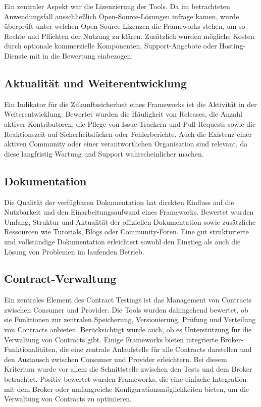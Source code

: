 Ein zentraler Aspekt war die Lizenzierung der Tools.
Da im betrachteten Anwendungsfall ausschließlich Open-Source-Lösungen infrage kamen, wurde überprüft unter welchen Open-Source-Lizenzen die Frameworks stehen, um so Rechte und Pflichten der Nutzung zu klären.
Zusätzlich wurden mögliche Kosten durch optionale kommerzielle Komponenten, Support-Angebote oder Hosting-Dienste mit in die Bewertung einbezogen.

\subsection{Aktualität und Weiterentwicklung}\label{subsec:frameworks_criterion_activity}

Ein Indikator für die Zukunftssicherheit eines Frameworks ist die Aktivität in der Weiterentwicklung.
Bewertet wurden die Häufigkeit von Releases, die Anzahl aktiver Kontributoren, die Pflege von Issue-Trackern und Pull Requests sowie die Reaktionszeit auf Sicherheitslücken oder Fehlerberichte.
Auch die Existenz einer aktiven Community oder einer verantwortlichen Organisation sind relevant, da diese langfristig Wartung und Support wahrscheinlicher machen.

\subsection{Dokumentation}\label{subsec:frameworks_criterion_documentation}

Die Qualität der verfügbaren Dokumentation hat direkten Einfluss auf die Nutzbarkeit und den Einarbeitungsaufwand eines Frameworks.
Bewertet wurden Umfang, Struktur und Aktualität der offiziellen Dokumentation sowie zusätzliche Ressourcen wie Tutorials, Blogs oder Community-Foren.
Eine gut strukturierte und vollständige Dokumentation erleichtert sowohl den Einstieg als auch die Lösung von Problemen im laufenden Betrieb.

\subsection{Contract-Verwaltung}\label{subsec:frameworks_criterion_contractmanagement}

Ein zentrales Element des Contract Testings ist das Management von Contracts zwischen Consumer und Provider.
Die Tools wurden dahingehend bewertet, ob sie Funktionen zur zentralen Speicherung, Versionierung, Prüfung und Verteilung von Contracts anbieten.
Berücksichtigt wurde auch, ob es Unterstützung für die Verwaltung von Contracts gibt.
Einige Frameworks bieten integrierte Broker-Funktionalitäten, die eine zentrale Anlaufstelle für alle Contracts darstellen und den Austausch zwischen Consumer und Provider erleichtern.
Bei diesem Kriterium wurde vor allem die Schnittstelle zwischen den Tests und dem Broker betrachtet.
Positiv bewertet wurden Frameworks, die eine einfache Integration mit dem Broker oder umfangreiche Konfigurationsmöglichkeiten bieten, um die Verwaltung von Contracts zu optimieren.

